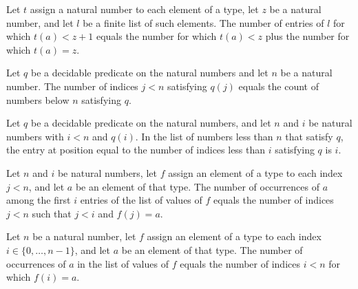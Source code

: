 \begin{theorem}
\label{List.length_filter_lt_succ}
\leanok
{}
Let $t$ assign a natural number to each element of a type, let $z$ be a natural number,
and let $l$ be a finite list of such elements. The number of entries of $l$ for which
$t(a)<z+1$ equals the number for which $t(a)<z$ plus the number for which $t(a)=z$.
\end{theorem}

\begin{theorem}
\label{List.length_filter_range}
\leanok
{}
Let $q$ be a decidable predicate on the natural numbers and let $n$ be a natural number.
The number of indices $j<n$ satisfying $q(j)$ equals the count of numbers below $n$
satisfying $q$.
\end{theorem}

\begin{theorem}
\label{List.getD_filter_range_count}
\leanok
{}
Let $q$ be a decidable predicate on the natural numbers, and let $n$ and $i$ be natural
numbers with $i<n$ and $q(i)$. In the list of numbers less than $n$ that satisfy $q$,
the entry at position equal to the number of indices less than $i$ satisfying $q$ is
$i$.
\end{theorem}

\begin{theorem}
\label{List.count_take_ofFn}
\leanok
{}
Let $n$ and $i$ be natural numbers, let $f$ assign an element of a type to each index
$j<n$, and let $a$ be an element of that type. The number of occurrences of $a$ among
the first $i$ entries of the list of values of $f$ equals the number of indices $j<n$
such that $j<i$ and $f(j)=a$.
\end{theorem}

\begin{theorem}
\label{List.count_ofFn}
\leanok
{}
Let $n$ be a natural number, let $f$ assign an element of a type to each index
$i\in\{0,\ldots,n-1\}$, and let $a$ be an element of that type. The number of
occurrences of $a$ in the list of values of $f$ equals the number of indices $i<n$ for
which $f(i)=a$.
\end{theorem}


